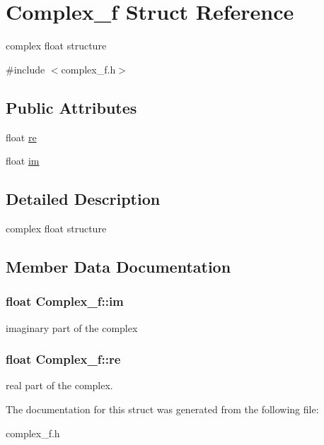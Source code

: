 \hypertarget{structComplex__f}{}\section{Complex\+\_\+f Struct Reference}
\label{structComplex__f}


complex float structure  




{\ttfamily \#include $<$complex\+\_\+f.\+h$>$}

\subsection*{Public Attributes}
\begin{DoxyCompactItemize}
\item 
float \hyperlink{structComplex__f_af0322eea7a75157c20129910e6d04057}{re}
\item 
float \hyperlink{structComplex__f_a257673d7e60735619fa0fcfa9882d670}{im}
\end{DoxyCompactItemize}


\subsection{Detailed Description}
complex float structure 

\subsection{Member Data Documentation}
\subsubsection[{\texorpdfstring{im}{im}}]{\setlength{\rightskip}{0pt plus 5cm}float Complex\+\_\+f\+::im}\hypertarget{structComplex__f_a257673d7e60735619fa0fcfa9882d670}{}\label{structComplex__f_a257673d7e60735619fa0fcfa9882d670}
imaginary part of the complex 
\subsubsection[{\texorpdfstring{re}{re}}]{\setlength{\rightskip}{0pt plus 5cm}float Complex\+\_\+f\+::re}\hypertarget{structComplex__f_af0322eea7a75157c20129910e6d04057}{}\label{structComplex__f_af0322eea7a75157c20129910e6d04057}
real part of the complex. 

The documentation for this struct was generated from the following file\+:\begin{DoxyCompactItemize}
\item 
complex\+\_\+f.\+h\end{DoxyCompactItemize}
